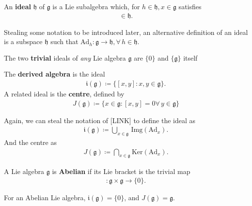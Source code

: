 \documentclass[11pt,fleqn]{article}
\begin{document}
\begin{definition}[Ideal]
	An \textbf{ideal} $\mathfrak{h}$ of $\mathfrak{g}$ is a Lie subalgebra which, for $h \in \mathfrak{h}, x \in \mathfrak{g}$ satisfies
		\begin{align}
			[h,x] \in \mathfrak{h}.
		\end{align}
\end{definition}

\begin{remark}
	Stealing some notation to be introduced later, an alternative definition of an ideal is a subspace $\mathfrak{h}$ such that $\text{Ad}_h : \mathfrak{g} \to \mathfrak{h}, \forall \, h \in \mathfrak{h}$.
\end{remark}

\begin{example}
	The two \textbf{trivial} ideals of \textit{any} Lie algebra $\mathfrak{g}$ are $\{0\}$ and $\{ \mathfrak{g} \}$ itself
\end{example}
\begin{example}
	The \textbf{derived algebra} is the ideal
		\begin{align}
			\mathfrak{i}(\mathfrak{g}) \coloneqq \{ [x,y] : x,y \in \mathfrak{g} \}.
		\end{align}
	A related ideal is the \textbf{centre}, defined by
		\begin{align}
			J(\mathfrak{g}) \coloneqq \{ x \in \mathfrak{g} : [x,y] = 0 \forall \, y \in \mathfrak{g} \}
		\end{align}
\end{example}
\begin{remark}
	Again, we can steal the notation of [LINK] to define the ideal as 
		\begin{align}
			\mathfrak{i}(\mathfrak{g}) \coloneqq \bigcup_{x \in \mathfrak{g}} \, \text{Img}(\text{Ad}_x).
		\end{align}
	And the centre as
		\begin{align}
			J(\mathfrak{g}) \coloneqq \bigcap_{x \in \mathfrak{g}} \text{Ker} ( \text{Ad}_x).
		\end{align}
\end{remark}

\begin{definition}
	A Lie algebra $\mathfrak{g}$ is \textbf{Abelian} if its Lie bracket is the trivial map 
		\begin{align}
			[\cdot,\cdot] : \mathfrak{g}\times \mathfrak{g} \to \{0\}.
		\end{align}
\end{definition}
\begin{remark}
	For an Abelian Lie algebra, $\mathfrak{i}(\mathfrak{g}) = \{0\}$, and $J(\mathfrak{g}) = \mathfrak{g}$.
\end{remark}
\end{document}
